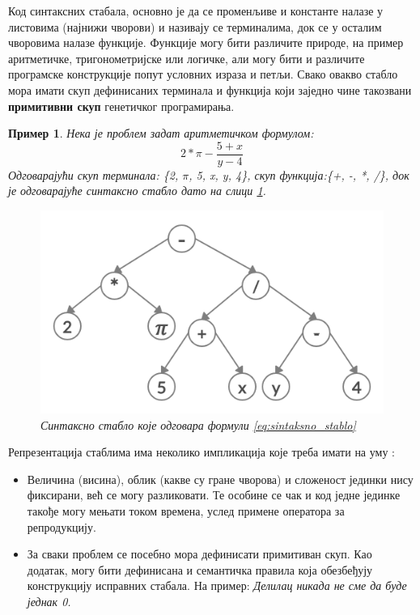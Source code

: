 \documentclass[a4paper]{article}
\newtheorem{primer}{Пример}[section] %
\begin{document}
Код синтаксних стабала, основно је да се променљиве и константе налазе у листовима (најнижи чворови) и називају се терминалима, док се у осталим чворовима налазе функције. Функције могу бити различите природе, на пример аритметичке, тригонометријске или логичке, али могу бити и различите програмске конструкције попут условних израза и петљи. Свако овакво стабло мора имати скуп дефинисаних терминала и функција који заједно чине такозвани \textbf{примитивни скуп} генетичког програмирања. 

\begin{primer}
    Нека је проблем задат аритметичком формулом: 
    \begin{equation} 
        \label{eq:sintaksno_stablo}
        2*\pi-\frac{5+x}{y-4}
    \end{equation}
    Одговарајући скуп терминала: \{2, $\pi$, 5, x, y, 4\}, скуп функција:\newline \{+, -, *, /\}, док је одговарајуће синтаксно стабло дато на слици \ref{fig:sintaksno_stablo}.

    \begin{figure}[h!]
        \begin{center}
        \includegraphics[scale=0.22]{sintaksnoStablo.png}
        \end{center}
        \caption{Синтаксно стабло које одговара формули \eqref{eq:sintaksno_stablo}}
        \label{fig:sintaksno_stablo}
    \end{figure}
\end{primer}

\medskip
Репрезентација стаблима има неколико импликација које треба имати на уму \cite{compIntelligence}:
\begin{itemize}
    \item Величина (висина), облик (какве су гране чворова) и сложеност јединки нису фиксирани, већ се могу разликовати. Те особине се чак и код једне јединке такође могу мењати током времена, услед примене оператора за репродукцију.
    \item За сваки проблем се посебно мора дефинисати примитиван скуп. Као додатак, могу бити дефинисана и семантичка правила која обезбеђују конструкцију исправних стабала. На пример: \newline
    \emph{Делилац никада не сме да буде једнак 0.}
\end{itemize}
\end{document}
